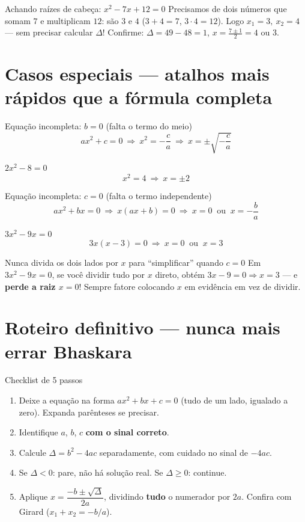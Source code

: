 \documentclass[12pt,a4paper]{article}
\begin{document}
\begin{exemplo}{Achando raízes de cabeça: $x^2-7x+12=0$}
Precisamos de dois números que somam $7$ e multiplicam $12$: são $3$ e
$4$ ($3+4=7$, $3\cdot4=12$). Logo $x_1=3,\ x_2=4$ — sem precisar calcular
$\Delta$! Confirme: $\Delta=49-48=1$, $x=\frac{7\pm1}{2}=4$ ou $3$.
\checkmark
\end{exemplo}

\section{Casos especiais — atalhos mais rápidos que a fórmula completa}

\begin{macete}{Equação incompleta: $b=0$ (falta o termo do meio)}
\[
ax^2+c=0 \ \Rightarrow\ x^2 = -\frac{c}{a} \ \Rightarrow\ x = \pm\sqrt{-\frac{c}{a}}
\]
\begin{exemplo}{$2x^2-8=0$}
\[
x^2=4 \ \Rightarrow\ x=\pm2
\]
\end{exemplo}
\end{macete}

\begin{macete}{Equação incompleta: $c=0$ (falta o termo independente)}
\[
ax^2+bx=0 \ \Rightarrow\ x(ax+b)=0 \ \Rightarrow\ x=0 \ \text{ ou } \ x=-\frac{b}{a}
\]
\begin{exemplo}{$3x^2-9x=0$}
\[
3x(x-3)=0 \ \Rightarrow\ x=0 \ \text{ ou } \ x=3
\]
\end{exemplo}
\end{macete}

\begin{atencao}{Nunca divida os dois lados por $x$ para ``simplificar'' quando $c=0$}
Em $3x^2-9x=0$, se você dividir tudo por $x$ direto, obtém $3x-9=0
\Rightarrow x=3$ — e \textbf{perde a raiz $x=0$}! Sempre fatore colocando
$x$ em evidência em vez de dividir.
\end{atencao}

\section{Roteiro definitivo — nunca mais errar Bhaskara}

\begin{macete}{Checklist de 5 passos}
\begin{enumerate}[nosep]
  \item Deixe a equação na forma $ax^2+bx+c=0$ (tudo de um lado, igualado a zero). Expanda parênteses se precisar.
  \item Identifique $a$, $b$, $c$ \textbf{com o sinal correto}.
  \item Calcule $\Delta=b^2-4ac$ separadamente, com cuidado no sinal de $-4ac$.
  \item Se $\Delta<0$: pare, não há solução real. Se $\Delta\ge0$: continue.
  \item Aplique $x=\dfrac{-b\pm\sqrt\Delta}{2a}$, dividindo \textbf{tudo} o numerador por $2a$. Confira com Girard ($x_1+x_2=-b/a$).
\end{enumerate}
\end{macete}
\end{document}
